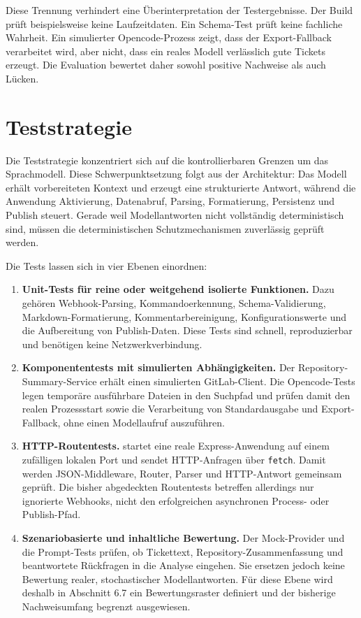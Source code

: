 Diese Trennung verhindert eine Überinterpretation der Testergebnisse. Der Build prüft beispielsweise keine Laufzeitdaten. Ein Schema-Test prüft keine fachliche Wahrheit. Ein simulierter Opencode-Prozess zeigt, dass der Export-Fallback verarbeitet wird, aber nicht, dass ein reales Modell verlässlich gute Tickets erzeugt. Die Evaluation bewertet daher sowohl positive Nachweise als auch Lücken.

\section{Teststrategie}

Die Teststrategie konzentriert sich auf die kontrollierbaren Grenzen um das Sprachmodell. Diese Schwerpunktsetzung folgt aus der Architektur: Das Modell erhält vorbereiteten Kontext und erzeugt eine strukturierte Antwort, während die Anwendung Aktivierung, Datenabruf, Parsing, Formatierung, Persistenz und Publish steuert. Gerade weil Modellantworten nicht vollständig deterministisch sind, müssen die deterministischen Schutzmechanismen zuverlässig geprüft werden.

Die Tests lassen sich in vier Ebenen einordnen:

\begin{enumerate}
\item \textbf{Unit-Tests für reine oder weitgehend isolierte Funktionen.} Dazu gehören Webhook-Parsing, Kommandoerkennung, Schema-Validierung, Markdown-Formatierung, Kommentarbereinigung, Konfigurationswerte und die Aufbereitung von Publish-Daten. Diese Tests sind schnell, reproduzierbar und benötigen keine Netzwerkverbindung.
\item \textbf{Komponententests mit simulierten Abhängigkeiten.} Der Repository-Summary-Service erhält einen simulierten GitLab-Client. Die Opencode-Tests legen temporäre ausführbare Dateien in den Suchpfad und prüfen damit den realen Prozessstart sowie die Verarbeitung von Standardausgabe und Export-Fallback, ohne einen Modellaufruf auszuführen.
\item \textbf{HTTP-Routentests.}  startet eine reale Express-Anwendung auf einem zufälligen lokalen Port und sendet HTTP-Anfragen über \texttt{fetch}. Damit werden JSON-Middleware, Router, Parser und HTTP-Antwort gemeinsam geprüft. Die bisher abgedeckten Routentests betreffen allerdings nur ignorierte Webhooks, nicht den erfolgreichen asynchronen Process- oder Publish-Pfad.
\item \textbf{Szenariobasierte und inhaltliche Bewertung.} Der Mock-Provider und die Prompt-Tests prüfen, ob Tickettext, Repository-Zusammenfassung und beantwortete Rückfragen in die Analyse eingehen. Sie ersetzen jedoch keine Bewertung realer, stochastischer Modellantworten. Für diese Ebene wird deshalb in Abschnitt 6.7 ein Bewertungsraster definiert und der bisherige Nachweisumfang begrenzt ausgewiesen.
\end{enumerate}

